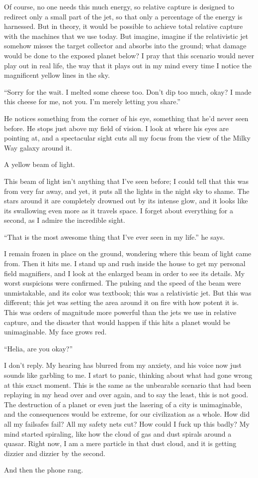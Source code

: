 \documentclass{book}
\begin{document}
			Of course, no one needs this much energy, so relative capture is designed to redirect
			only a small part of the jet, so that only a percentage of the energy is harnessed.
			But in theory, it would be possible to achieve total relative capture with the machines
			that we use today. But imagine, imagine if the relativistic jet somehow misses the
			target collector and absorbs into the ground; what damage would be done to the exposed
			planet below? I pray that this scenario would never play out in real life, the way that
			it plays out in my mind every time I notice the magnificent yellow lines in the sky.

			``Sorry for the wait. I melted some cheese too. Don't dip too much, okay? I made this
			cheese for me, not you. I'm merely letting you share.''

			He notices something from the corner of his eye, something that he'd never seen before.
			He stops just above my field of vision. I look at where his eyes are pointing at, and
			a spectacular sight cuts all my focus from the view of the Milky Way galaxy around it.

			A yellow beam of light.

			This beam of light isn't anything that I've seen before; I could tell that this was from
			very far away, and yet, it puts all the lights in the night sky to shame. The stars around it
			are completely drowned out by its intense glow, and it looks like its swallowing even more as it
			travels space. I forget about everything for a second, as I admire the
			incredible sight.

			``That is the most awesome thing that I've ever seen in my life.'' he says.

			I remain frozen in place on the ground, wondering where this beam of light came from.
			Then it hits me. I stand up and rush inside the house to get my personal field magnifiers,
			and I look at the enlarged beam in order to see its details. My worst suspicions were
			confirmed. The pulsing and the speed of the beam were unmistakable, and its color was
			textbook; this was a relativistic jet. But this was different; this jet was setting the
			area around it on fire with how potent it is. This was orders of magnitude more powerful
			than the jets we use in relative capture, and the disaster that would happen if this
			hits a planet would be unimaginable. My face grows red.

			``Helia, are you okay?''

			I don't reply. My hearing has blurred from my anxiety, and his voice now just sounds like
			garbling to me. I start to panic, thinking about what had gone wrong at this exact moment.
			This is the same as the unbearable scenario that had been replaying in my head over and over again,
			and to say the least, this is not good. The destruction of a planet or even just the lasering of a
			city is unimaginable, and the consequences would be extreme, for our civilization as a whole. How
			did all my failsafes fail? All my safety nets cut? How could I fuck up this badly? My mind
			started spiraling, like how the cloud of gas and dust spirals around a quasar. Right now, I am
			a mere particle in that dust cloud, and it is getting dizzier and dizzier by the second.

			And then the phone rang.
\end{document}
